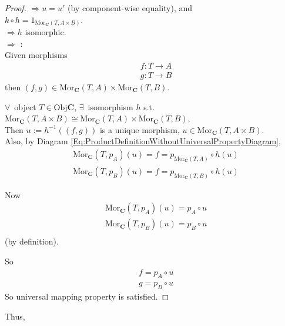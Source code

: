 \documentclass[10pt]{amsart}
\begin{document}
\begin{multicols*}{2}
\begin{proof}
$\Longrightarrow u= u'$ (by component-wise equality), and \\
$k\circ h = 1_{\text{Mor}_{\mathbf{C}}(T,A\times B)}$. \\
$\Longrightarrow h$ isomorphic. \\

$\Longrightarrow$ : \\

Given morphisms
\[
\begin{aligned}
& f:T \to A \\ 
& g:T \to B
\end{aligned}
\]
then $(f, g) \in \text{Mor}_{\mathbf{C}}(T, A) \times \text{Mor}_{\mathbf{C}}(T,B)$.

$\forall \, $ object $T\in \text{Obj}\mathbf{C}$, $\exists \, $ isomorphism $h$ s.t. $\text{Mor}_{\mathbf{C}}(T, A\times B) \cong \text{Mor}_{\mathbf{C}}(T,A) \times \text{Mor}_{\mathbf{C}}(T,B)$, \\
Then $u:=h^{-1}((f, g))$ is a unique morphism, $u\in \text{Mor}_{\mathbf{C}}(T, A\times B)$. \\
Also, by Diagram \ref{Eq:ProductDefinitionWithoutUniversalPropertyDiagram}, 
\[
\begin{aligned}
& \text{Mor}_{\mathbf{C}}(T,p_A)(u) = f = p_{\text{Mor}_{\mathbf{C}}(T,A)} \circ h(u) \\ 
& \text{Mor}_{\mathbf{C}}(T,p_B)(u) = f = p_{\text{Mor}_{\mathbf{C}}(T,B)} \circ h(u) 
\end{aligned}
\]

Now
\[
\begin{aligned}
& \text{Mor}_{\mathbf{C}}(T, p_A)(u) = p_A \circ u \\
& \text{Mor}_{\mathbf{C}}(T, p_B)(u) = p_B \circ u \\
\end{aligned}
\]
(by definition).

So
\[
\begin{aligned} 
& f = p_A \circ u \\ 
& g = p_B \circ u
\end{aligned} 
\]
So universal mapping property is satisfied.
\end{proof}

Thus,


\end{multicols*}
\end{document}

